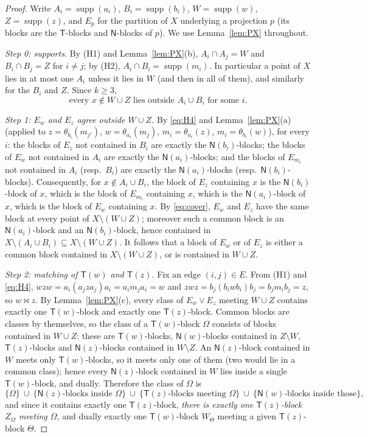 \documentclass[11pt]{amsart}
\theoremstyle{definition}
\newcommand{\supp}{\operatorname{supp}}
\newcommand{\T}{\mathsf{T}}
\newcommand{\N}{\mathsf{N}}
\begin{document}
\begin{proof}
Write $A_i=\supp(a_i)$, $B_i=\supp(b_i)$, $W=\supp(w)$, $Z=\supp(z)$, and $E_p$ for the partition of $X$ underlying a projection $p$ (its blocks are the $\T$-blocks and $\N$-blocks of $p$). We use Lemma~\ref{lem:PX} throughout.

\emph{Step 0: supports.} By (H1) and Lemma~\ref{lem:PX}(b), $A_i\cap A_j=W$ and $B_i\cap B_j=Z$ for $i\ne j$; by (H2), $A_i\cap B_i=\supp(m_i)$. In particular a point of $X$ lies in at most one $A_i$ unless it lies in $W$ (and then in all of them), and similarly for the $B_i$ and $Z$. Since $k\ge3$,
\begin{equation}\label{eq:cover}
\text{every } x\notin W\cup Z \text{ lies outside } A_i\cup B_i \text{ for some } i .
\end{equation}

\emph{Step 1: $E_w$ and $E_z$ agree outside $W\cup Z$.} By \eqref{eq:H4} and Lemma~\ref{lem:PX}(a) (applied to $z=\theta_{b_i}(m_{j'})$, $w=\theta_{a_i}(m_j)$, $m_i=\theta_{a_i}(z)$, $m_i=\theta_{b_i}(w)$), for every $i$: the blocks of $E_z$ not contained in $B_i$ are exactly the $\N(b_i)$-blocks; the blocks of $E_w$ not contained in $A_i$ are exactly the $\N(a_i)$-blocks; and the blocks of $E_{m_i}$ not contained in $A_i$ (resp.\ $B_i$) are exactly the $\N(a_i)$-blocks (resp.\ $\N(b_i)$-blocks). Consequently, for $x\notin A_i\cup B_i$, the block of $E_z$ containing $x$ is the $\N(b_i)$-block of $x$, which is the block of $E_{m_i}$ containing $x$, which is the $\N(a_i)$-block of $x$, which is the block of $E_w$ containing $x$. By \eqref{eq:cover}, $E_w$ and $E_z$ have the same block at every point of $X\setminus(W\cup Z)$; moreover such a common block is an $\N(a_i)$-block and an $\N(b_i)$-block, hence contained in $X\setminus(A_i\cup B_i)\subseteq X\setminus(W\cup Z)$. It follows that a block of $E_w$ or of $E_z$ is either a common block contained in $X\setminus(W\cup Z)$, or is contained in $W\cup Z$.

\emph{Step 2: matching of $\T(w)$ and $\T(z)$.} Fix an edge $(i,j)\in E$. From (H1) and \eqref{eq:H4}, $wzw=a_i(a_jza_j)a_i=a_im_ja_i=w$ and $zwz=b_j(b_iwb_i)b_j=b_jm_ib_j=z$, so $w\bowtie z$. By Lemma~\ref{lem:PX}(c), every class of $E_w\vee E_z$ meeting $W\cup Z$ contains exactly one $\T(w)$-block and exactly one $\T(z)$-block. Common blocks are classes by themselves, so the class of a $\T(w)$-block $\Omega$ consists of blocks contained in $W\cup Z$: these are $\T(w)$-blocks, $\N(w)$-blocks contained in $Z\setminus W$, $\T(z)$-blocks and $\N(z)$-blocks contained in $W\setminus Z$. An $\N(z)$-block contained in $W$ meets only $\T(w)$-blocks, so it meets only one of them (two would lie in a common class); hence every $\N(z)$-block contained in $W$ lies inside a single $\T(w)$-block, and dually. Therefore the class of $\Omega$ is
\[
\{\Omega\}\ \cup\ \{\N(z)\text{-blocks inside }\Omega\}\ \cup\ \{\T(z)\text{-blocks meeting }\Omega\}\ \cup\ \{\N(w)\text{-blocks inside those}\},
\]
and since it contains exactly one $\T(z)$-block, \emph{there is exactly one $\T(z)$-block $Z_\Omega$ meeting $\Omega$}, and dually exactly one $\T(w)$-block $W_\Theta$ meeting a given $\T(z)$-block $\Theta$.


\end{proof}
\end{document}
